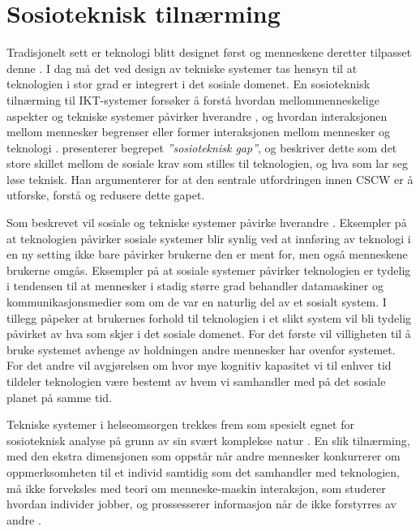 \section{Sosioteknisk tilnærming}
\label{sec:sosioteknisk}
Tradisjonelt sett er teknologi blitt designet først og menneskene deretter tilpasset denne \citep{Appelbaum97}. I dag må det ved design av tekniske systemer tas hensyn til at teknologien i stor grad er integrert i det sosiale domenet. En sosioteknisk tilnærming til IKT-systemer forsøker å forstå hvordan mellommenneskelige aspekter og tekniske systemer påvirker hverandre \citep{Coiera04}, og hvordan interaksjonen mellom mennesker begrenser eller former interaksjonen mellom mennesker og teknologi \citep{Coiera07}. \citet{Ackerman00} presenterer begrepet \textit{”sosioteknisk gap”}, og beskriver dette som det store skillet mellom de sosiale krav som stilles til teknologien, og hva som lar seg løse teknisk. Han argumenterer for at den sentrale utfordringen innen CSCW er å utforske, forstå og redusere dette gapet. 

\noindent
Som beskrevet vil sosiale og tekniske systemer påvirke hverandre \citep{Coiera04}. Eksempler på at teknologien påvirker sosiale systemer blir synlig ved at innføring av teknologi i en ny setting ikke bare påvirker brukerne den er ment for, men også menneskene brukerne omgås. Eksempler på at sosiale systemer påvirker teknologien er tydelig i tendensen til at mennesker i stadig større grad behandler datamaskiner og kommunikasjonsmedier som om de var en naturlig del av et sosialt system. I tillegg påpeker \citet{Coiera07} at brukernes forhold til teknologien i et slikt system vil bli tydelig påvirket av hva som skjer i det sosiale domenet. For det første vil villigheten til å bruke systemet avhenge av holdningen andre mennesker har ovenfor systemet. For det andre vil avgjørelsen om hvor mye kognitiv kapasitet vi til enhver tid tildeler teknologien være bestemt av hvem vi samhandler med på det sosiale planet på samme tid.

\noindent
Tekniske systemer i helseomsorgen trekkes frem som spesielt egnet for sosioteknisk analyse på grunn av sin svært komplekse natur \citep{Coiera07, Berg99}.
En slik tilnærming, med den ekstra dimensjonen som oppstår når andre mennesker konkurrerer om oppmerksomheten til et individ samtidig som det samhandler med teknologien, må ikke forveksles med teori om menneske-maskin interaksjon, som studerer hvordan individer jobber, og prossesserer informasjon når de ikke forstyrres av andre \citep{Coiera07}.
